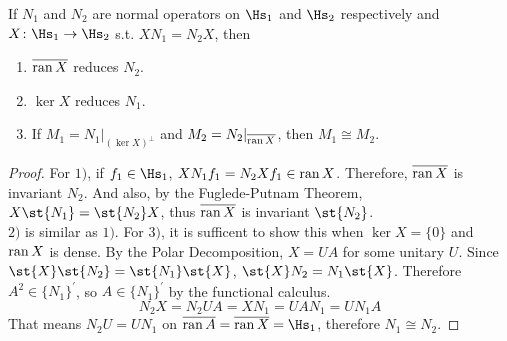 \begin{prop}
	If $N_1$ and $N_2$ are normal operators on $\Hs_1$ and $\Hs_2$ respectively and $X \colon \Hs_1 \sto \Hs_2$ s.t. $XN_1 = N_2X$, then 
	\begin{enumerate}[label=\arabic*)]
		\item $\overline{\operatorname{ran}{X}}$ reduces $N_2$.
		\item $\ker{X}$ reduces $N_1$.
		\item If $M_1 = N_1|_{(\ker{X})^{\bot}}$ and $M_2 = N_2|_{\overline{\operatorname{ran}{X}}}$, then $M_1 \cong M_2$.
	\end{enumerate}
\end{prop}
\begin{proof}
	For $1)$, if $f_1 \in \Hs_1$, $XN_1f_1 = N_2Xf_1 \in \operatorname{ran}{X}$. Therefore, $\overline{\operatorname{ran}{X}}$ is invariant $N_2$. And also, by the Fuglede-Putnam Theorem, $X\st{N_1} = \st{N_2}X$, thus $\overline{\operatorname{ran}{X}}$ is invariant $\st{N_2}$.\\
	$2)$ is similar as $1)$.
	For $3)$, it is sufficent to show this when $\ker{X}=\{0\}$ and $\operatorname{ran}{X}$ is dense. By the Polar Decomposition, $X=UA$ for some unitary $U$. Since $\st{X}\st{N_2} = \st{N_1}\st{X}$, $\st{X}N_2 = N_1\st{X}$. Therefore $A^2 \in \{N_1\}^{'}$, so $A \in \{N_1\}^{'}$ by the functional calculus.
	\begin{equation*}
		N_2X = N_2UA= XN_1 = UAN_1 = UN_1A
	\end{equation*}
	That means $N_2U=UN_1$ on $\clo{\ran{A}} = \clo{\ran{X}} = \Hs_1$, therefore $N_1 \cong N_2$.
\end{proof}


